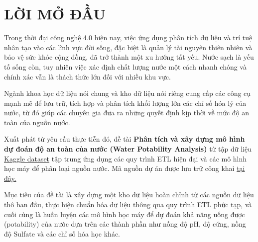 {}
\section*{LỜI MỞ ĐẦU}
Trong thời đại công nghệ 4.0 hiện nay, việc ứng dụng phân tích dữ liệu và trí tuệ nhân tạo vào các lĩnh vực đời sống, đặc biệt là quản lý tài nguyên thiên nhiên và bảo vệ sức khỏe cộng đồng, đã trở thành một xu hướng tất yếu. Nước sạch là yếu tố sống còn, tuy nhiên việc xác định chất lượng nước một cách nhanh chóng và chính xác vẫn là thách thức lớn đối với nhiều khu vực.

Ngành khoa học dữ liệu nói chung và kho dữ liệu nói riêng cung cấp các công cụ mạnh mẽ để lưu trữ, tích hợp và phân tích khối lượng lớn các chỉ số hóa lý của nước, từ đó giúp các chuyên gia đưa ra những quyết định kịp thời về mức độ an toàn của nguồn nước.

Xuất phát từ yêu cầu thực tiễn đó, đề tài \textbf{Phân tích và xây dựng mô hình dự đoán độ an toàn của nước (Water Potability Analysis)} từ tập dữ liệu \href{https://www.kaggle.com/datasets/uom190346a/water-quality-and-potability}{\color{blue} Kaggle dataset} tập trung ứng dụng các quy trình ETL hiện đại và các mô hình học máy để phân loại nguồn nước. Mã nguồn dự án được lưu trữ công khai \href{https://github.com/Shootingstar2608/data_warehouse_assignment}{\color{blue} tại đây.}

Mục tiêu của đề tài là xây dựng một kho dữ liệu hoàn chỉnh từ các nguồn dữ liệu thô ban đầu, thực hiện chuẩn hóa dữ liệu thông qua quy trình ETL phức tạp, và cuối cùng là huấn luyện các mô hình học máy để dự đoán khả năng uống được (potability) của nước dựa trên các thành phần như nồng độ pH, độ cứng, nồng độ Sulfate và các chỉ số hóa học khác.